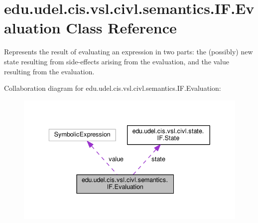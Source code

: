 \hypertarget{classedu_1_1udel_1_1cis_1_1vsl_1_1civl_1_1semantics_1_1IF_1_1Evaluation}{}\section{edu.\+udel.\+cis.\+vsl.\+civl.\+semantics.\+I\+F.\+Evaluation Class Reference}
\label{classedu_1_1udel_1_1cis_1_1vsl_1_1civl_1_1semantics_1_1IF_1_1Evaluation}


Represents the result of evaluating an expression in two parts\+: the (possibly) new state resulting from side-\/effects arising from the evaluation, and the value resulting from the evaluation.  




Collaboration diagram for edu.\+udel.\+cis.\+vsl.\+civl.\+semantics.\+I\+F.\+Evaluation\+:
\nopagebreak
\begin{figure}[H]
\begin{center}
\leavevmode
\includegraphics[width=336pt]{classedu_1_1udel_1_1cis_1_1vsl_1_1civl_1_1semantics_1_1IF_1_1Evaluation__coll__graph}
\end{center}
\end{figure}

